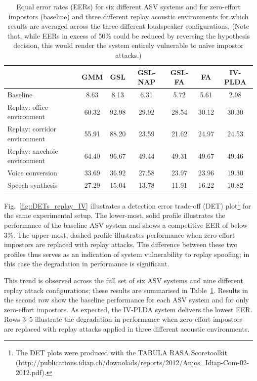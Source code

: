 \begin{table}
\renewcommand{\arraystretch}{1.2}
\begin{center}
    \begin{tabular}{ l  c c c c c c}
    \hline
 &  GMM & GSL & GSL-NAP  & GSL-FA & FA & IV-PLDA \\ 
 \hline \hline
Baseline & 8.63 & 8.13 & 6.31 & 5.72 & 5.61 & 2.98\\
\hline
Replay: office environment & 60.32 & 92.98 & 29.92 & 28.54 & 30.12 & 30.30\\
Replay: corridor environment & 55.91 & 88.20 & 23.59 & 21.62 & 24.97 & 24.53\\
Replay: anechoic environment & 64.40 & 96.67 & 49.44 & 49.31 & 49.67 & 49.46\\
\hline
Voice conversion & 33.69 & 36.92 & 27.58 & 23.97 & 23.96 & 19.30\\
Speech synthesis & 27.29 & 15.04 & 13.78 & 11.91 & 16.22 & 10.82\\
\hline
    \end{tabular}
    \caption{Equal error rates (EERs) for six different ASV systems and for zero-effort impostors (baseline) and three different replay acoustic environments for which results are averaged across the three different loudspeaker configurations.  (Note that, while EERs in excess of 50\% could be reduced by reversing the hypothesis decision, this would render the system entirely vulnerable to na{\"{i}}ve impostor attacks.)}
		\label{tab::results_EER}
   \end{center}
\end{table}







Fig.~\ref{fig::DETs_replay_IV} illustrates a detection error trade-off (DET) plot\footnote{The DET plots were produced with the TABULA RASA Scoretoolkit (http://publications.idiap.ch/downolads/reports/2012/Anjos\_Idiap-Com-02-2012.pdf).} for the same experimental setup.  The lower-most, solid profile illustrates the performance of the baseline ASV system and shows a competitive EER of below 3\%.  The upper-most, dashed profile illustrates performance when zero-effort impostors are replaced with replay attacks.  The difference between these two profiles thus serves as an indication of system vulnerability to replay spoofing; in this case the degradation in performance is significant.  



This trend is observed across the full set of six ASV systems and nine different replay attack configurations;  
these results are summarised in Table~\ref{tab::results_EER}.
Results in the second row show the baseline performance for each ASV system and for only zero-effort impostors.
As expected, the IV-PLDA system delivers the lowest EER.
Rows 3--5 illustrate the degradation in performance when zero-effort impostors are replaced with replay attacks applied in three different acoustic environments.

